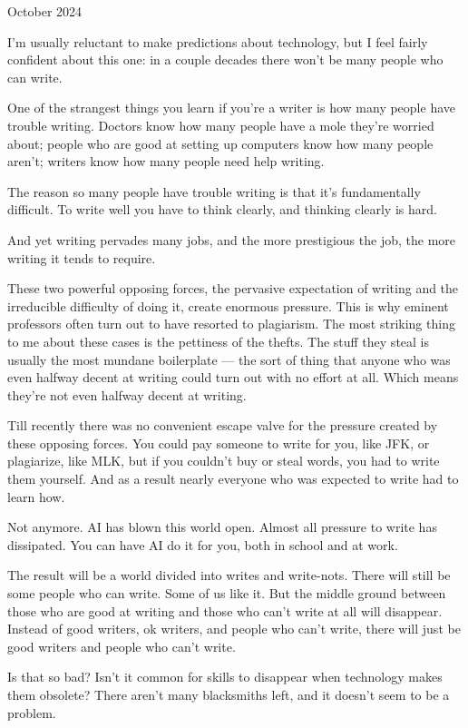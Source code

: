 October 2024

I'm usually reluctant to make predictions about technology, but I feel
fairly confident about this one: in a couple decades there won't be many
people who can write.

One of the strangest things you learn if you're a writer is how many
people have trouble writing. Doctors know how many people have a mole
they're worried about; people who are good at setting up computers know
how many people aren't; writers know how many people need help writing.

The reason so many people have trouble writing is that it's
fundamentally difficult. To write well you have to think clearly, and
thinking clearly is hard.

And yet writing pervades many jobs, and the more prestigious the job,
the more writing it tends to require.

These two powerful opposing forces, the pervasive expectation of writing
and the irreducible difficulty of doing it, create enormous pressure.
This is why eminent professors often turn out to have resorted to
plagiarism. The most striking thing to me about these cases is the
pettiness of the thefts. The stuff they steal is usually the most
mundane boilerplate --- the sort of thing that anyone who was even
halfway decent at writing could turn out with no effort at all. Which
means they're not even halfway decent at writing.

Till recently there was no convenient escape valve for the pressure
created by these opposing forces. You could pay someone to write for
you, like JFK, or plagiarize, like MLK, but if you couldn't buy or steal
words, you had to write them yourself. And as a result nearly everyone
who was expected to write had to learn how.

Not anymore. AI has blown this world open. Almost all pressure to write
has dissipated. You can have AI do it for you, both in school and at
work.

The result will be a world divided into writes and write-nots. There
will still be some people who can write. Some of us like it. But the
middle ground between those who are good at writing and those who can't
write at all will disappear. Instead of good writers, ok writers, and
people who can't write, there will just be good writers and people who
can't write.

Is that so bad? Isn't it common for skills to disappear when technology
makes them obsolete? There aren't many blacksmiths left, and it doesn't
seem to be a problem.

